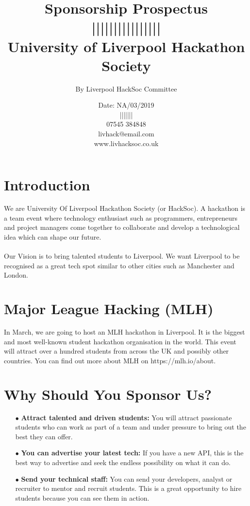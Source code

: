 \documentclass[10pt, a4paper, onecolumn]{report}
\title{%
       \Huge \textcolor{MyGold}{Sponsorship Prospectus}
       \\
       \large ||||||||||||||||
       \\
       \large {University of Liverpool Hackathon Society}}
\author{By Liverpool HackSoc Committee}
\date{Date: NA/03/2019 \\
        \large ||||||| \\
        \large 07545 384848 \\
        \large \textcolor{MyLinkBlue}{livhack@email.com} \\
        \large \textcolor{MyLinkBlue}{www.livhacksoc.co.uk}
    }
\begin{document}
    \pagecolor{MyMidBlack}
    \color{white}
    \maketitle

    
    \section *{Introduction}
    We are University Of Liverpool Hackathon Society (or HackSoc). A hackathon is a team event where technology enthusiast such as programmers, entrepreneurs and project managers come together to collaborate and develop a technological idea which can shape our future. 
    \\
    \\
    Our Vision is to bring talented students to Liverpool. We want Liverpool to be recognised as a great tech spot similar to other cities such as Manchester and London. 

    \section *{Major League Hacking (MLH)}
    In March, we are going to host an MLH hackathon in Liverpool. It is the biggest and most well-known student hackathon organisation in the world. This event will attract over a hundred students from across the UK and possibly other countries. You can find out more about MLH on \textcolor{MyLinkBlue}{https://mlh.io/about}.
    
    
    \section *{Why Should You Sponsor Us?}
    
    \begin{itemize}
        \item[$\bullet$] \textbf{Attract talented and driven students: }You will attract passionate students who can work as part of a team and under pressure to bring out the best they can offer.
        \item[$\bullet$] \textbf{You can advertise your latest tech: }
        If you have a new API, this is the best way to advertise and seek the endless possibility on what it can do.
        \item[$\bullet$] \textbf{Send your technical staff: }
        You can send your developers, analyst or recruiter to mentor and recruit students. This is a great opportunity to hire students because you can see them in action. 
    \end{itemize}
     
\end{document}
